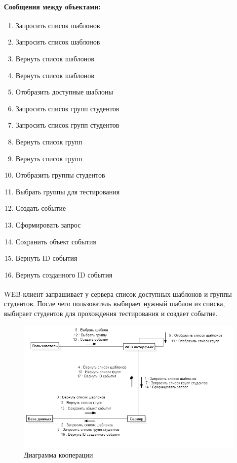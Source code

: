 \documentclass{article}
\begin{document}
        \paragraph{Сообщения между объектами:}
        \begin{enumerate}
            \item Запросить список шаблонов
            \item Запросить список шаблонов
            \item Вернуть список шаблонов
            \item Вернуть список шаблонов
            \item Отобразить доступные шаблоны
            \item Запросить список групп студентов
            \item Запросить список групп студентов
            \item Вернуть список групп
            \item Вернуть список групп
            \item Отобразить группы студентов
            \item Выбрать группы для тестирования
            \item Создать событие
            \item Сформировать запрос
            \item Сохранить объект события
            \item Вернуть ID события
            \item Вернуть созданного ID события
        \end{enumerate}
        \paragraph{}
        WEB-клиент запрашивает у сервера список доступных шаблонов и группы
        студентов. После чего пользователь выбирает нужный шаблон из списка,
        выбирает студентов для прохождения тестирования и создает событие.
        \begin{figure}[H]
            \includegraphics[width=\textwidth, center]
                {Communication_CreateTestInstance}
            \caption{Диаграмма кооперации}
        \end{figure}
\end{document}
